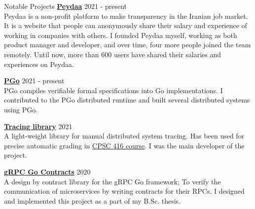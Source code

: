 \documentclass{resume} %
\begin{document}
\begin{rSection}{Notable Projects}
	{\bf \href{https://peydaa.ir/}{Peydaa}} \hfill 2021 - present
	\\ Peydaa is a non-profit platform to make transparency in the Iranian job market. It is a website that people can anonymously share their salary and experience of working in companies with others. I founded Peydaa myself, working as both product manager and developer, and over time, four more people joined the team remotely. Until now, more than 600 users have shared their salaries and experiences on Peydaa.

	{\bf \href{https://github.com/UBC-NSS/pgo}{PGo}} \hfill 2021 - present
	\\PGo compiles verifiable formal specifications into Go implementations. I contributed to the PGo distributed runtime and built several distributed systems using PGo. 

	{\bf \href{https://github.com/DistributedClocks/tracing}{Tracing library}} \hfill 2021
	\\A light-weight library for manual distributed system tracing. Has been used for precise automatic grading in \href{https://www.cs.ubc.ca/~bestchai/teaching/cs416_2020w2/index.html}{CPSC 416 course}. I was the main developer of the project.

    {\bf \href{https://github.com/shayanh/grpc-go-contracts}{gRPC Go Contracts}} \hfill 2020
    \\A design by contract library for the gRPC Go framework; To verify the communication of microservices by writing contracts for their RPCs. I designed and implemented this project as a part of my B.Sc. thesis.


\end{rSection}
\end{document}
